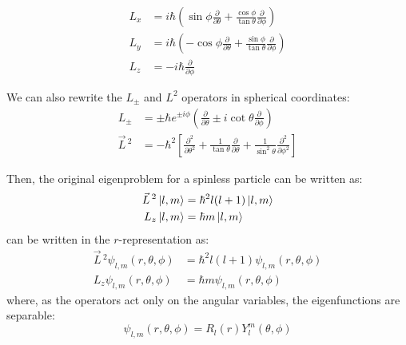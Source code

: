 \begin{equation} \label{LxLyLz}
    \begin{split}
        L_x &= i\hbar \left(\sin\phi\frac{\partial}{\partial\theta} + \frac{\cos\phi}{\tan\theta}\frac{\partial}{\partial\phi}\right) \\
        L_y &= i\hbar \left(-\cos\phi\frac{\partial}{\partial\theta} + \frac{\sin\phi}{\tan\theta}\frac{\partial}{\partial\phi}\right) \\
        L_z &= -i\hbar \frac{\partial}{\partial\phi}
    \end{split}
\end{equation}

We can also rewrite the $L_\pm$ and $L^2$ operators in spherical coordinates:
\begin{equation}
    \begin{split}
        L_\pm &= \pm\hbar e^{\pm i\phi}\left(\frac{\partial}{\partial\theta} \pm i\cot\theta\frac{\partial}{\partial\phi}\right) \\
        \vec{L}\,^2 &= -\hbar^2\left[\frac{\partial^2}{\partial \theta^2}+ \frac{1}{\tan \theta} \frac{\partial }{\partial \theta } + \frac{1}{\sin^2\theta}\frac{\partial^2}{\partial \phi^2}\right]
    \end{split}
\end{equation}

Then, the original eigenproblem for a spinless particle can be written as:
\begin{equation} 
    \begin{split}
        \vec{L}\,^2\ket{l,m} &= \hbar^2l(l+1)\ket{l,m} \\
        L_z\ket{l,m} &= \hbar m\ket{l,m}
    \end{split}
\end{equation}
can be written in the $r$-representation as:
\begin{equation} 
    \begin{split}
        \vec{L}\,^2\psi_{l,m} (r, \theta, \phi) &= \hbar^2l(l+1)\psi_{l,m} (r, \theta, \phi) \\
        L_z\psi_{l,m} (r, \theta, \phi) &= \hbar m\psi_{l,m} (r, \theta, \phi)
    \end{split}
\end{equation}
where, as the operators act only on the angular variables, the eigenfunctions are separable:
\begin{equation}
    \psi_{l,m} (r, \theta, \phi) = R_{l}(r)Y_l^m(\theta, \phi)
\end{equation}

